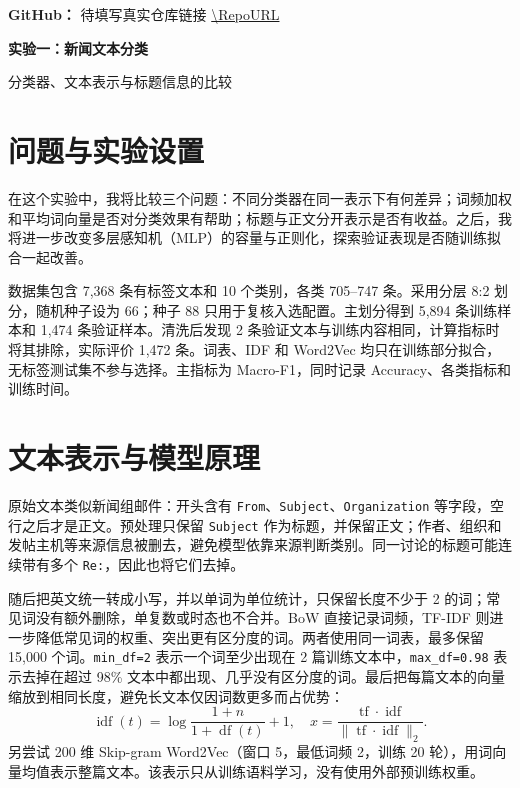 \documentclass[UTF8,a4paper,10pt,fontset=fandol]{ctexart}
\begin{document}
\pagestyle{plain}
\fontsize{9pt}{10.5pt}\selectfont
\noindent\textbf{GitHub：}\ifdefempty{\RepoURL}
{\textcolor{red!60!black}{待填写真实仓库链接}}
{\expandafter\url\expandafter{\RepoURL}}

\begin{center}
{\Large\bfseries 实验一：新闻文本分类}\par
\vspace{1pt}
{\small 分类器、文本表示与标题信息的比较\quad\StudentInfo}
\end{center}
\vspace{-7pt}

\section{问题与实验设置}
在这个实验中，我将比较三个问题：不同分类器在同一表示下有何差异；词频加权和平均词向量是否对分类效果有帮助；标题与正文分开表示是否有收益。之后，我将进一步改变多层感知机（MLP）的容量与正则化，探索验证表现是否随训练拟合一起改善。

数据集包含 7,368 条有标签文本和 10 个类别，各类 705--747 条。采用分层 8:2 划分，随机种子设为 66；种子 88 只用于复核入选配置。主划分得到 5,894 条训练样本和 1,474 条验证样本。清洗后发现 2 条验证文本与训练内容相同，计算指标时将其排除，实际评价 1,472 条。词表、IDF 和 Word2Vec 均只在训练部分拟合，无标签测试集不参与选择。主指标为 Macro-F1，同时记录 Accuracy、各类指标和训练时间。

\section{文本表示与模型原理}
原始文本类似新闻组邮件：开头含有 \texttt{From}、\texttt{Subject}、\texttt{Organization} 等字段，空行之后才是正文。预处理只保留 \texttt{Subject} 作为标题，并保留正文；作者、组织和发帖主机等来源信息被删去，避免模型依靠来源判断类别。同一讨论的标题可能连续带有多个 \texttt{Re:}，因此也将它们去掉。

随后把英文统一转成小写，并以单词为单位统计，只保留长度不少于 2 的词；常见词没有额外删除，单复数或时态也不合并。BoW 直接记录词频，TF-IDF 则进一步降低常见词的权重、突出更有区分度的词。两者使用同一词表，最多保留 15,000 个词。\texttt{min\_df=2} 表示一个词至少出现在 2 篇训练文本中，\texttt{max\_df=0.98} 表示去掉在超过 98\% 文本中都出现、几乎没有区分度的词。最后把每篇文本的向量缩放到相同长度，避免长文本仅因词数更多而占优势：
\[
\operatorname{idf}(t)=\log\frac{1+n}{1+\operatorname{df}(t)}+1,\quad
x=\frac{\operatorname{tf}\cdot\operatorname{idf}}{\|\operatorname{tf}\cdot\operatorname{idf}\|_2}.
\]
另尝试 200 维 Skip-gram Word2Vec（窗口 5，最低词频 2，训练 20 轮），用词向量均值表示整篇文本。该表示只从训练语料学习，没有使用外部预训练权重。
\end{document}
